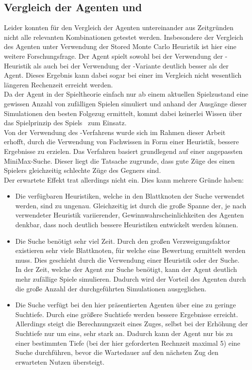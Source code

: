 \subsection{Vergleich der Agenten \mxZitat{\mc} und \mxZitat{\abp}}
\label{subsec:Fazit:AgentenVgl}
Leider konnten für den Vergleich der Agenten untereinander aus Zeitgründen nicht alle relevanten Kombinationen getestet werden. Insbesondere der Vergleich des \mxZitat{\abp} Agenten unter Verwendung der Stored Monte Carlo Heuristik ist hier eine weitere Forschungsfrage.
Der \mxZitat{\mc} Agent spielt sowohl bei der Verwendung der -Heuristik als auch bei der Verwendung der \mc -Variante deutlich besser als der \mxZitat{\abp} Agent. Dieses Ergebnis kann dabei sogar bei einer im Vergleich nicht wesentlich längeren Rechenzeit erreicht werden.
\\Da der \mxZitat{\mc} Agent in der Spieltheorie einfach nur ab einem aktuellen Spielzustand eine gewissen Anzahl von zufälligen Spielen simuliert und anhand der Ausgänge dieser Simulationen den besten Folgezug ermittelt, kommt dabei keinerlei Wissen über das Spielprinzip des Spiels \ot\ zum Einsatz. 
\\Von der Verwendung des \mxZitat{\abab}-Verfahrens wurde sich im Rahmen dieser Arbeit erhofft, durch die Verwendung von Fachwissen in Form einer Heuristik, bessere Ergebnisse zu erzielen. Das Verfahren basiert grundlegend auf einer angepassten MiniMax-Suche. Dieser liegt die Tatsache zugrunde, dass gute Züge des einen Spielers gleichzeitig schlechte Züge des Gegners sind.
\\Der erwartete Effekt trat allerdings nicht ein. Dies kann mehrere Gründe haben:
\begin{itemize}
\item Die verfügbaren Heuristiken, welche in den Blattknoten der \mxZitat{\abp} Suche verwendet werden, sind zu ungenau. Gleichzeitig ist durch die große Spanne der, je nach verwendeter Heuristik variierender, Gewinnwahrscheinlichkeiten des \mxZitat{\abp} Agenten denkbar, dass noch deutlich bessere Heuristiken entwickelt werden können.
\item Die \mxZitat{\abp} Suche benötigt sehr viel Zeit. Durch den großen Verzweigungsfaktor existieren sehr viele Blattknoten, für welche eine Bewertung ermittelt werden muss. Dies geschieht durch die Verwendung einer Heuristik oder der \mxZitat{\mc} Suche.
\\In der Zeit, welche der \mxZitat{\abp} Agent zur Suche benötigt, kann der \mxZitat{\mc} Agent deutlich mehr zufällige Spiele simulieren. Dadurch wird der Vorteil des \mxZitat{\abp} Agenten durch die große Anzahl der durchgeführten Simulationen ausgeglichen.
\item Die \mxZitat{\abp} Suche verfügt bei den hier präsentierten Agenten über eine zu geringe Suchtiefe. Durch eine größere Suchtiefe werden bessere Ergebnisse erreicht. Allerdings steigt die Berechnungszeit eines Zuges, selbst bei der Erhöhung der Suchtiefe nur um eins, sehr stark an. Dadurch kann der Agent nur bis zu einer bestimmten Tiefe (bei der hier geforderten Rechnzeit maximal 5) eine \mxZitat{\abp} Suche durchführen, bevor die Wartedauer auf den nächsten Zug den erwarteten Nutzen übersteigt. 
\end{itemize} 

